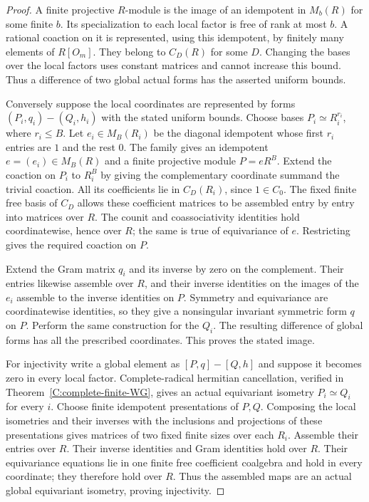 \begin{proof}
A finite projective $R$-module is the image of an
idempotent in $M_b(R)$ for some finite $b$.
Its specialization to each local factor is free
of rank at most $b$.
A rational coaction on it is represented, using
this idempotent, by finitely many elements of
$R[O_m]$. They belong to $C_D(R)$ for some $D$.
Changing the bases over the local factors uses
constant matrices and cannot increase this bound.
Thus a difference of two global actual forms
has the asserted uniform bounds.

Conversely suppose the local coordinates are
represented by forms $(P_i,q_i)-(Q_i,h_i)$ with
the stated uniform bounds. Choose bases
$P_i\simeq R_i^{r_i}$, where $r_i\leq B$.
Let $e_i\in M_B(R_i)$ be the diagonal idempotent
whose first $r_i$ entries are $1$ and the rest $0$.
The family gives an idempotent
$e=(e_i)\in M_B(R)$ and a finite projective module
$P=eR^B$.
Extend the coaction on $P_i$ to $R_i^B$ by giving
the complementary coordinate summand the trivial
coaction. All its coefficients lie in $C_D(R_i)$,
since $1\in C_0$.
The fixed finite free basis of $C_D$ allows these
coefficient matrices to be assembled entry by
entry into matrices over $R$.
The counit and coassociativity identities hold
coordinatewise, hence over $R$; the same is true
of equivariance of $e$.
Restricting gives the required coaction on $P$.

Extend the Gram matrix $q_i$ and its inverse
by zero on the complement. Their entries likewise
assemble over $R$, and their inverse identities
on the images of the $e_i$ assemble to the inverse
identities on $P$. Symmetry and equivariance are
coordinatewise identities, so they give a
nonsingular invariant symmetric form $q$ on $P$.
Perform the same construction for the $Q_i$.
The resulting difference of global forms has
all the prescribed coordinates. This proves
the stated image.

For injectivity write a global element as
$[P,q]-[Q,h]$ and suppose it becomes zero in
every local factor. Complete-radical hermitian
cancellation, verified in
Theorem~\ref{C:complete-finite-WG}, gives an actual
equivariant isometry $P_i\simeq Q_i$ for every $i$.
Choose finite idempotent presentations of $P,Q$.
Composing the local isometries and their inverses
with the inclusions and projections of these
presentations gives matrices of two fixed finite
sizes over each $R_i$. Assemble their entries
over $R$. Their inverse identities and Gram
identities hold over $R$.
Their equivariance equations lie in one finite
free coefficient coalgebra and hold in every
coordinate; they therefore hold over $R$.
Thus the assembled maps are an actual global
equivariant isometry, proving injectivity.


\end{proof}
